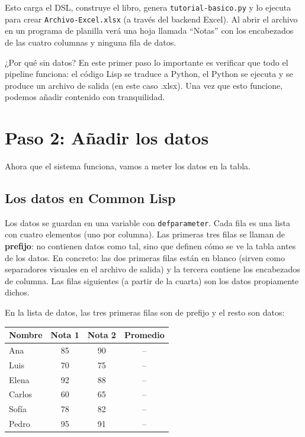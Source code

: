 \documentclass[12pt,a4paper]{report}
\begin{document}
Esto carga el DSL, construye el libro, genera \texttt{tutorial-basico.py}
y lo ejecuta para crear \texttt{Archivo-Excel.xlsx} (a través del
backend Excel).  Al abrir el archivo en un programa de planilla verá
una hoja llamada ``Notas'' con los encabezados de las cuatro columnas
y ninguna fila de datos.

\begin{infobox}{¿Por qué sin datos?}
  En este primer paso lo importante es verificar que todo el pipeline
  funciona: el código Lisp se traduce a Python, el Python se ejecuta y
  se produce un archivo de salida (en este caso .xlsx).  Una vez que
  esto funcione, podemos añadir contenido con tranquilidad.
\end{infobox}

\section{Paso 2: Añadir los datos}

Ahora que el sistema funciona, vamos a meter los datos en la tabla.

\subsection{Los datos en Common Lisp}

Los datos se guardan en una variable con \texttt{defparameter}.  Cada
fila es una lista con cuatro elementos (uno por columna).  Las primeras
tres filas se llaman de \textbf{prefijo}: no contienen datos como tal,
sino que definen cómo se ve la tabla antes de los datos.  En concreto:
las dos primeras filas están en blanco (sirven como separadores
visuales en el archivo de salida) y la tercera contiene los encabezados
de columna.  Las filas siguientes (a partir de la cuarta) son los datos
propiamente dichos.

En la lista de datos, las tres primeras filas son de prefijo y el
resto son datos:

\begin{center}
\begin{tabular}{lccc}
\toprule
\textbf{Nombre} & \textbf{Nota 1} & \textbf{Nota 2} & \textbf{Promedio} \\
\midrule
Ana    & 85 & 90 & -- \\
Luis   & 70 & 75 & -- \\
Elena  & 92 & 88 & -- \\
Carlos & 60 & 65 & -- \\
Sofía  & 78 & 82 & -- \\
Pedro  & 95 & 91 & -- \\
\bottomrule
\end{tabular}
\end{center}
\end{document}
